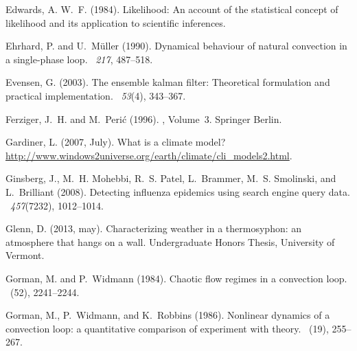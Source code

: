 \documentclass[12pt]{report}
\begin{document}
\begin{thebibliography}{}
Edwards, A. W.~F. (1984).
\newblock Likelihood: An account of the statistical concept of likelihood and
  its application to scientific inferences.

Ehrhard, P. and U.~M{\"u}ller (1990).
\newblock Dynamical behaviour of natural convection in a single-phase loop.
~{\em 217}, 487--518.

Evensen, G. (2003).
\newblock The ensemble kalman filter: Theoretical formulation and practical
  implementation.
~{\em 53\/}(4), 343--367.

Ferziger, J.~H. and M.~Peri{\'c} (1996).
, Volume~3.
\newblock Springer Berlin.

Gardiner, L. (2007, July).
\newblock What is a climate model?
\newblock \url{http://www.windows2universe.org/earth/climate/cli_models2.html}.

Ginsberg, J., M.~H. Mohebbi, R.~S. Patel, L.~Brammer, M.~S. Smolinski, and
  L.~Brilliant (2008).
\newblock Detecting influenza epidemics using search engine query data.
~{\em 457\/}(7232), 1012--1014.

Glenn, D. (2013, may).
\newblock Characterizing weather in a thermosyphon: an atmosphere that hangs on
  a wall.
\newblock Undergraduate Honors Thesis, University of Vermont.

Gorman, M. and P.~Widmann (1984).
\newblock Chaotic flow regimes in a convection loop.
~(52), 2241--2244.

Gorman, M., P.~Widmann, and K.~Robbins (1986).
\newblock Nonlinear dynamics of a convection loop: a quantitative comparison of
  experiment with theory.
~(19), 255--267.


\end{thebibliography}
\end{document}
